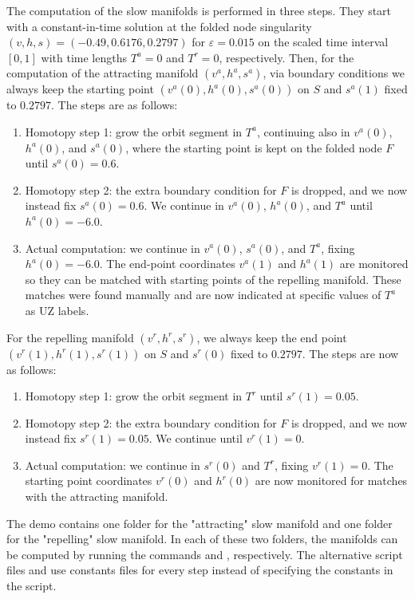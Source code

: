 \documentclass[12pt]{report}
\begin{document}
The computation of the slow manifolds is performed in three steps.
They start with a constant-in-time solution at the folded node singularity
$(v,h,s)=(-0.49,0.6176,0.2797)$ for $\varepsilon=0.015$ on the scaled
time interval $[0,1]$ with time lengths $T^a=0$ and $T^r=0$, respectively.
Then, for the computation of the attracting manifold $(v^a,h^a,s^a)$,
via boundary conditions we always keep the starting point
$(v^a(0),h^a(0),s^a(0))$ on $S$ and $s^a(1)$ fixed to $0.2797$.
The steps are as follows:
\begin{enumerate}
\item
Homotopy step 1: grow the orbit segment in $T^a$, continuing also in
$v^a(0)$, $h^a(0)$, and $s^a(0)$, where the starting point
is kept on the folded node $F$ until $s^a(0)=0.6$.
\item
Homotopy step 2: the extra boundary condition for $F$ is dropped,
and we now instead fix $s^a(0)=0.6$.
We continue in $v^a(0)$, $h^a(0)$, and $T^a$ until $h^a(0)=-6.0$.
\item
Actual computation: we continue in $v^a(0)$, $s^a(0)$, and $T^a$,
fixing $h^a(0)=-6.0$. The end-point coordinates $v^a(1)$ and $h^a(1)$
are monitored so they can be matched with starting points of the
repelling manifold. These matches were found manually and are
now indicated at specific values of $T^a$ as UZ labels.
\end{enumerate}

For the repelling manifold $(v^r,h^r,s^r)$,
we always keep the end point $(v^r(1),h^r(1),s^r(1))$ on $S$
and $s^r(0)$ fixed to $0.2797$.
The steps are now as follows:
\begin{enumerate}
\item
Homotopy step 1: grow the orbit segment in $T^r$ until $s^r(1)=0.05$.
\item
Homotopy step 2: the extra boundary condition for $F$ is dropped,
and we now instead fix $s^r(1)=0.05$. We continue until $v^r(1)=0$.
\item
Actual computation: we continue in $s^r(0)$ and $T^r$,
fixing $v^r(1)=0$. The starting point coordinates $v^r(0)$ and $h^r(0)$
are now monitored for matches with the attracting manifold.
\end{enumerate}

The demo contains one folder 
for the "attracting" slow manifold and one folder  for 
the "repelling" slow manifold. In each of these two folders, the
manifolds can be computed by running the commands
 and , respectively.
The alternative
script files  and  use constants
files for every step instead of specifying the constants in the
script.
\end{document}
